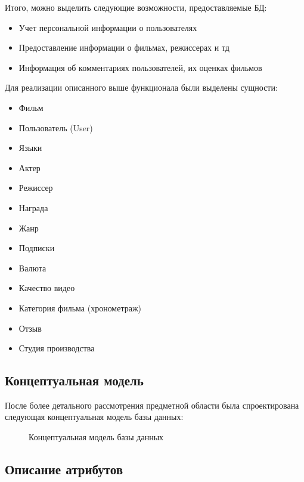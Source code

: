 Итого, можно выделить следующие возможности, предоставляемые БД:
\begin{itemize}
\item Учет персональной информации о пользователях
\item Предоставление информации о фильмах, режиссерах и тд
\item Информация об комментариях пользователей, их оценках фильмов
\end{itemize}
Для реализации описанного выше функционала были выделены сущности:
\begin{itemize}
    \item Фильм
    \item Пользователь (User)
    \item Языки
    \item Актер
 \item Режиссер
    \item Награда
      \item Жанр
    \item Подписки
    \item Валюта
    \item Качество видео
    \item Категория фильма (хронометраж)
    \item Отзыв
    \item Студия производства
\end{itemize}

\subsection{Концептуальная модель}
После более детального рассмотрения предметной области была спроектирована следующая концептуальная модель базы данных:
\begin{figure} [h]
    \caption{Концептуальная модель базы данных}
\end{figure}

\subsection{Описание атрибутов}
\begin{thebibliography}{}

\end{thebibliography}



